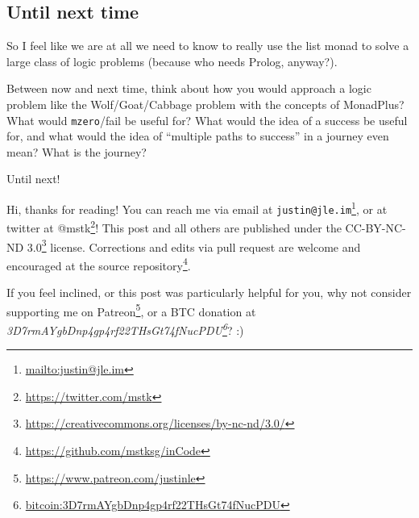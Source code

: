 \documentclass[]{article}
\renewcommand{\href}[2]{#2\footnote{\url{#1}}}
\begin{document}
\hypertarget{until-next-time}{%
\subsection{Until next time}\label{until-next-time}}

So I feel like we are at all we need to know to really use the list monad to
solve a large class of logic problems (because who needs Prolog, anyway?).

Between now and next time, think about how you would approach a logic problem
like the Wolf/Goat/Cabbage problem with the concepts of MonadPlus? What would
\texttt{mzero}/fail be useful for? What would the idea of a success be useful
for, and what would the idea of ``multiple paths to success'' in a journey even
mean? What is the journey?

Until next!

Hi, thanks for reading! You can reach me via email at
\href{mailto:justin@jle.im}{\nolinkurl{justin@jle.im}}, or at twitter at
\href{https://twitter.com/mstk}{@mstk}! This post and all others are published
under the \href{https://creativecommons.org/licenses/by-nc-nd/3.0/}{CC-BY-NC-ND
3.0} license. Corrections and edits via pull request are welcome and encouraged
at \href{https://github.com/mstksg/inCode}{the source repository}.

If you feel inclined, or this post was particularly helpful for you, why not
consider \href{https://www.patreon.com/justinle}{supporting me on Patreon}, or a
BTC donation at
\emph{\href{bitcoin:3D7rmAYgbDnp4gp4rf22THsGt74fNucPDU}{3D7rmAYgbDnp4gp4rf22THsGt74fNucPDU}}?
:)
\end{document}
